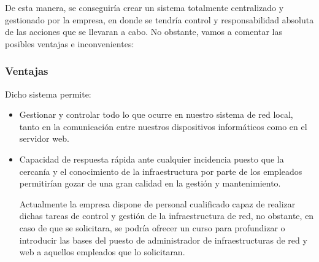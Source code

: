 \documentclass[12pt,letterpaper]{article}
\begin{document}
De esta manera, se conseguiría crear un sistema totalmente centralizado y gestionado por la empresa, en donde se tendría control y responsabilidad absoluta de las acciones que se llevaran a cabo. No obstante, vamos a comentar las posibles ventajas e inconvenientes:
	\subsubsection{Ventajas} 
	Dicho sistema permite:
	\begin{itemize}  
	\item Gestionar y controlar todo lo que ocurre en nuestro sistema de red local, tanto en la comunicación entre nuestros dispositivos informáticos como en el servidor web.
	\item Capacidad de respuesta rápida ante cualquier incidencia puesto que la cercanía y el conocimiento de la infraestructura por parte de los empleados permitirían gozar de una gran calidad en la gestión y mantenimiento.\par
	Actualmente la empresa dispone de personal cualificado capaz de realizar dichas tareas de control y gestión de la infraestructura de red, no obstante, en caso de que se solicitara, se podría ofrecer un curso para profundizar o introducir las bases del puesto de administrador de infraestructuras de red y web a aquellos empleados que lo solicitaran.
	\end{itemize}
	
\end{document}
